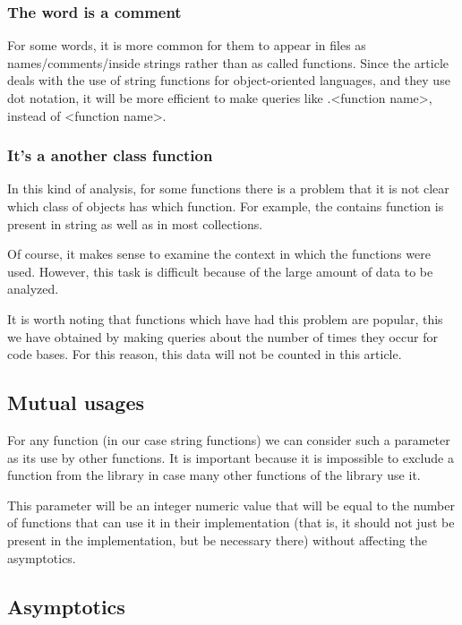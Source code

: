 \documentclass[anonymous,sigplan,review,11pt,nonacm,natbib=false]{acmart}
\begin{document}
    \subsubsection{The word is a comment}

    For some words, it is more common for them to appear in files as names/comments/inside strings rather than as called functions. Since the article deals with the use of string functions for object-oriented languages, and they use dot notation, it will be more efficient to make queries like .<function name>, instead of <function name>.

    \subsubsection{It's a another class function}

    In this kind of analysis, for some functions there is a problem that it is not clear which class of objects has which function. For example, the contains function is present in string as well as in most collections.

    Of course, it makes sense to examine the context in which the functions were used. However, this task is difficult because of the large amount of data to be analyzed.

    It is worth noting that functions which have had this problem are popular, this we have obtained by making queries about the number of times they occur for code bases. For this reason, this data will not be counted in this article.

    \subsection{Mutual usages}

    For any function (in our case string functions) we can consider such a parameter as its use by other functions. It is important because it is impossible to exclude a function from the library in case many other functions of the library use it.

    This parameter will be an integer numeric value that will be equal to the number of functions that can use it in their implementation (that is, it should not just be present in the implementation, but be necessary there) without affecting the asymptotics.

    \subsection{Asymptotics}
\end{document}
